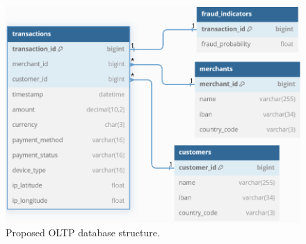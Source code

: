 \documentclass[11pt,a4paper,computermodern]{article}
\begin{document}
\begin{figure}[!htb]
	\centering
	\includegraphics[scale=0.7]{./figures/OLTP}
	\caption{Proposed OLTP database structure.}
	\label{fig:OLTP}
\end{figure}
\end{document}
